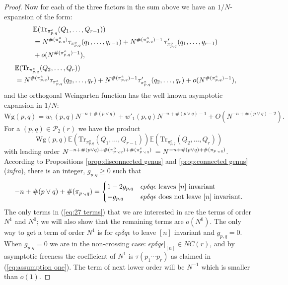 \documentclass[11pt]{amsart}
\theoremstyle{definition}
\numberwithin{theorem}{section}
\newcommand{\cP}{\mathcal{P}}
\newcommand{\NC}{\mathit{NC}}
\newcommand{\peq}{{p \mskip 2mu\cdot_\epsilon q}}
\newcommand{\rE} {\mathbb{E}}
\newcommand{\Tr}{\mathrm{Tr}}
\newcommand{\Wg}{\mathrm{Wg}}
\begin{document}
\begin{proof}
Now for each of the three factors in the sum above we have
an $1/N$-expansion of the form:
\begin{align*}\lefteqn{
\rE(\Tr_{\pi_{p,q}^o}(Q_1, \dots, Q_{r -1}))}  \\
& =
N^{\#(\pi_{p,q}^o)} \tau_{\pi_{p,q}^o}(q_1, \dots, q_{r -1}) + 
N^{\#(\pi_{p,q}^o) - 1}\, \tau'_{\pi_{p,q}^o}(q_1, \dots, q_{r -1}) \\
&\mbox{}  + o(N^{\#(\pi_{p,q}^o) - 1}),
\end{align*}
\begin{align*} \lefteqn{
\rE(\Tr_{\pi_{p,q}^e}(Q_2, \dots, Q_{r})) } \\
& =
N^{\#(\pi_{p,q}^e)} \tau_{\pi_{p,q}^e}(q_2, \dots, q_{r}) + 
N^{\#(\pi_{p,q}^e)- 1} \tau'_{\pi_{p,q}^e}(q_2, \dots, q_{r}) + o(N^{\#(\pi_{p,q}^e)- 1} ),
\end{align*}
and the orthogonal Weingarten function has the well known
asymptotic expansion in $1/N$:
\[
\Wg(p, q) = w_1(p, q)N^{-n + \#(p \vee q)} + w'_1(p, q)N^{-n + \#(p \vee q) -1} + O(N^{-n + \#(p \vee q) - 2}).
\]
For a $(p, q) \in \cP_2(r)$ we have the product 
\begin{equation}\label{eq:27 terms}
\Wg(p, q) 
\rE(\Tr_{\pi_{p,q}^o}(Q_1, \dots, Q_{r -1}))
\rE(\Tr_{\pi_{p,q}^e}(Q_2, \dots, Q_{r})) 
\end{equation}
with leading order $N^{-n + \#(p \vee q) + \#(\pi_\peq^o) +
  \#(\pi^e_\peq)}$ $ = N^{-n + \#(p \vee q) +
  \#(\pi_\peq)}$. According to Propositions
\ref{prop:disconnected genus} and \ref{prop:connected genus}
(\textit{infra}), there is an integer, $g_{p,q} \geq 0$ such
that
\[
-n + \#(p \vee q) + \#(\pi_\peq)
=
\begin{cases} 1 - 2 g_{p,q} & \epsilon p \delta q \epsilon \mbox{\ leaves\ } [n]\mbox{\ invariant}\\
- g_{p,q}& \epsilon p \delta q \epsilon \mbox{\ does not leave\ } [n]\mbox{\ invariant}.
\end{cases}
\]
The only terms in (\ref{eq:27 terms}) that we are interested
in are the terms of order $N^1$ and $N^0$; we will also show
that the remaining terms are $o(N^0)$. The only way to get a
term of order $N^1$ is for $\epsilon p \delta q \epsilon$ to
leave $[n]$ invariant and $g_{p,q} = 0$. When $g_{p,q} = 0$
we are in the non-crossing case: $\epsilon p \delta q
\epsilon|_{[n]} \in \NC(r)$, and by asymptotic freeness the
coefficient of $N^1$ is $\tau(p_1 \cdots p_r)$ as claimed in
(\ref{eq:assumption one}). The term of next lower order will
be $N^{-1}$ which is smaller than $o(1)$.


\end{proof}
\end{document}
